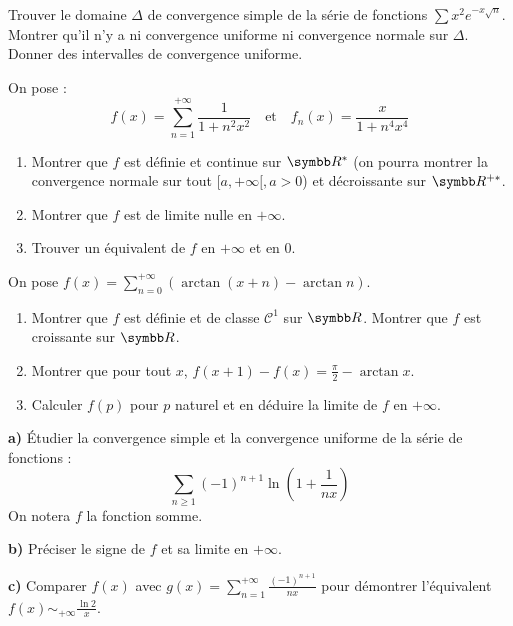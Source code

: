 \begin{exercice}
Trouver le domaine $\Delta$ de convergence simple de la série de fonctions $\sum x^2 e^{-x\sqrt{n}}$.
Montrer qu'il n'y a ni convergence uniforme ni convergence normale sur $\Delta$.
Donner des intervalles de convergence uniforme.
\end{exercice}

\begin{exercice}
On pose :
$$ f(x) = \sum_{n=1}^{+\infty} \frac{1}{1+n^2 x^2} \quad \text{et} \quad f_n(x) = \frac{x}{1+n^4 x^4} $$
\begin{enumerate}
    \item Montrer que $f$ est définie et continue sur $\R^*$ (on pourra montrer la convergence normale sur tout $[a, +\infty[, a>0$) et décroissante sur $\R^{+*}$.
    \item Montrer que $f$ est de limite nulle en $+\infty$.
    \item Trouver un équivalent de $f$ en $+\infty$ et en $0$.
\end{enumerate}
\end{exercice}

\begin{exercice}
On pose $f(x) = \sum_{n=0}^{+\infty} (\arctan(x+n) - \arctan n)$.
\begin{enumerate}
    \item Montrer que $f$ est définie et de classe $\mathcal{C}^1$ sur $\R$. Montrer que $f$ est croissante sur $\R$.
    \item Montrer que pour tout $x$, $f(x+1) - f(x) = \frac{\pi}{2} - \arctan x$.
    \item Calculer $f(p)$ pour $p$ naturel et en déduire la limite de $f$ en $+\infty$.
\end{enumerate}
\end{exercice}

\begin{exercice}
\textbf{a)} Étudier la convergence simple et la convergence uniforme de la série de fonctions :
$$ \sum_{n\ge 1} (-1)^{n+1} \ln\left(1+\frac{1}{nx}\right) $$
On notera $f$ la fonction somme.

\textbf{b)} Préciser le signe de $f$ et sa limite en $+\infty$.

\textbf{c)} Comparer $f(x)$ avec $g(x) = \sum_{n=1}^{+ \infty} \frac{(-1)^{n+1}}{nx}$ pour démontrer l'équivalent $f(x) \sim_{+\infty} \frac{\ln 2}{x}$.
\end{exercice}

